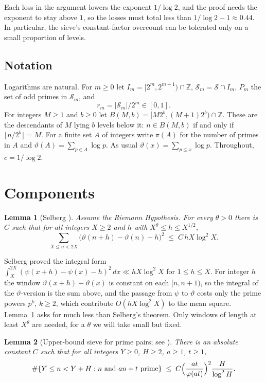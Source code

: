 \documentclass[11pt]{amsart}
\newtheorem{lemma}{Lemma}[section]
\newcommand{\Z}{\mathbb{Z}}
\newcommand{\Sset}{\mathcal{S}}
\newcommand{\vt}{\vartheta}
\begin{document}
Each loss in the argument lowers the exponent $1/\log 2$, and the proof
needs the exponent to stay above $1$, so the losses must total less than
$1/\log 2 - 1 \approx 0.44$. In particular, the sieve's constant-factor
overcount can be tolerated only on a small proportion of levels.

\subsection*{Notation}
Logarithms are natural. For $m \ge 0$ let $I_m = [2^m, 2^{m+1}) \cap \Z$,
$\Sset_m = \Sset \cap I_m$, $P_m$ the set of odd primes in $\Sset_m$, and
\[
r_m = |\Sset_m| / 2^m \in [0,1].
\]
For integers $M \ge 1$ and $b \ge 0$ let
$B(M, b) = [M 2^b, (M+1) 2^b) \cap \Z$. These are the descendants of $M$
lying $b$ levels below it: $n \in B(M,b)$ if and only if
$\lfloor n / 2^b \rfloor = M$. For a finite set $A$ of integers write
$\pi(A)$ for the number of primes in $A$ and $\vt(A) = \sum_{p \in A}
\log p$. As usual $\vt(x) = \sum_{p \le x}\log p$. Throughout,
$c = 1/\log 2$.

\section{Components}

\begin{lemma}[Selberg \cite{Sel}]
\label{lem:selberg}
Assume the Riemann Hypothesis. For every $\theta > 0$ there is $C$ such
that for all integers $X \ge 2$ and $h$ with $X^\theta \le h \le X^{1/2}$,
\[
\sum_{X \le n < 2X} \bigl(\vt(n+h) - \vt(n) - h\bigr)^2 \;\le\; C\, h X \log^2 X .
\]
\end{lemma}

Selberg proved the integral form
$\int_X^{2X} (\psi(x+h) - \psi(x) - h)^2\,dx \ll h X \log^2 X$ for
$1 \le h \le X$. For integer $h$ the window $\vt(x+h) - \vt(x)$ is
constant on each $[n, n+1)$, so the integral of the $\vt$-version is the
sum above, and the passage from $\psi$ to $\vt$ costs only the prime
powers $p^k$, $k \ge 2$, which contribute $O(hX\log^2 X)$ to the mean
square. Lemma~\ref{lem:selberg} asks
for much less than Selberg's theorem. Only windows of length at least
$X^\theta$ are needed, for a $\theta$ we will take small but fixed.

\begin{lemma}[Upper-bound sieve for prime pairs; see \cite{HR}]
\label{lem:sieve}
There is an absolute constant $C$ such that for all integers $Y \ge 0$,
$H \ge 2$, $a \ge 1$, $t \ge 1$,
\[
\#\{Y \le n < Y + H : n \text{ and } an + t \text{ prime}\}
\;\le\; C \Bigl(\frac{at}{\varphi(at)}\Bigr)^2 \frac{H}{\log^2 H}.
\]
\end{lemma}
\end{document}
